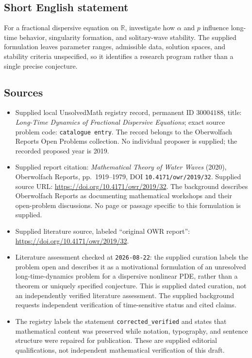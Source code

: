 \documentclass[11pt]{article}
\newcommand{\R}{\mathbb{R}}
\begin{document}
\subsection{Short English statement}
For a fractional dispersive equation on \(\R\), investigate how \(\alpha\) and \(p\) influence long-time behavior, singularity formation, and solitary-wave stability. The supplied formulation leaves parameter ranges, admissible data, solution spaces, and stability criteria unspecified, so it identifies a research program rather than a single precise conjecture.
\subsection{Sources}
\begin{itemize}
\item Supplied local UnsolvedMath registry record, permanent ID \(30004188\), title: \emph{Long-Time Dynamics of Fractional Dispersive Equations}; exact source problem code: \texttt{catalogue entry}. The record belongs to the Oberwolfach Reports Open Problems collection. No individual proposer is supplied; the recorded proposed year is 2019.
\item Supplied report citation: \emph{Mathematical Theory of Water Waves} (2020), Oberwolfach Reports, pp.\ 1919--1979, DOI \texttt{10.4171/owr/2019/32}. Supplied source URL: \url{https://doi.org/10.4171/owr/2019/32}. The background describes Oberwolfach Reports as documenting mathematical workshops and their open-problem discussions. No page or passage specific to this formulation is supplied.
\item Supplied literature source, labeled ``original OWR report'': \url{https://doi.org/10.4171/owr/2019/32}.
\item Literature assessment checked at \texttt{2026-08-22}: the supplied curation labels the problem open and describes it as a motivational formulation of an unresolved long-time-dynamics problem for a dispersive nonlinear PDE, rather than a theorem or uniquely specified conjecture. This is supplied dated curation, not an independently verified literature assessment. The supplied background requests independent verification of time-sensitive status and cited claims.
\item The registry labels the statement \texttt{corrected\_verified} and states that mathematical content was preserved while notation, typography, and sentence structure were repaired for publication. These are supplied editorial qualifications, not independent mathematical verification of this draft.
\end{itemize}
\end{document}
